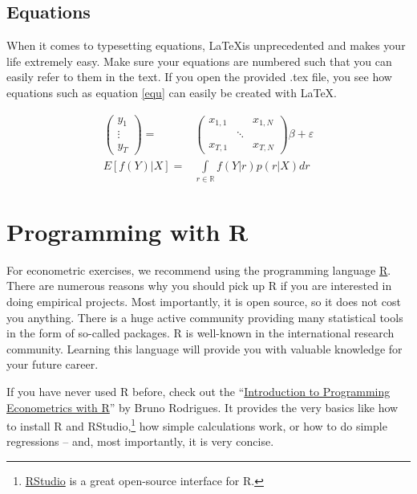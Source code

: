 \documentclass[a4paper, 12pt]{article}
\begin{document}
	\subsection{Equations}
	
	When it comes to typesetting equations, \LaTeX is unprecedented and makes your life extremely easy. Make sure your equations are numbered such that you can easily refer to them in the text. If you open the provided .tex file, you see how equations such as equation \eqref{equ} can easily be created with \LaTeX.
	
	\begin{align}	
	\left(\begin{array}{c}
	y_1\\ 
	\vdots\\ 
	y_T
	\end{array}\right)
	 =& \left( \begin{array}{ccc}
	 x_{1,1}&  & x_{1,N} \\ 
	 &  \ddots&  \\ 
	 x_{T,1}&  & x_{T,N}
	 \end{array} \right) \beta + \varepsilon  \\
	E\left[f(Y)|X\right] = & \int\limits_{r \in \mathbb{R}} f(Y|r)p(r|X)d r  \label{equ}
	\end{align}
	
	\section{Programming with R}\label{sec:R}
		
	For econometric exercises, we recommend using the programming language \href{https://en.wikipedia.org/wiki/R\_(programming\_language)}{R}. There are numerous reasons why you should pick up R if you are interested in doing empirical projects. Most importantly, it is open source, so it does not cost you anything. There is a huge active community providing many statistical tools in the form of so-called packages. R is well-known in the international research community. Learning this language will provide you with valuable knowledge for your future career.
		
	If you have never used R before, check out the ``\href{http://www.netviale.com/wp-content/uploads/2015/08/Introduction_to_programming_Econometrics_with_R.pdf}{Introduction to Programming Econometrics with R}'' by Bruno Rodrigues. It provides the very basics like how to install R and RStudio,\footnote{\href{https://www.rstudio.com/}{RStudio} is a great open-source interface for R.} how simple calculations work, or how to do simple regressions -- and, most importantly, it is very concise.
	
\end{document}
